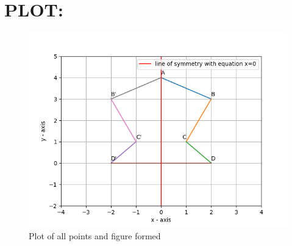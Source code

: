 \documentclass[11pt, letterpaper]{article}
\begin{document}
  \section{PLOT:}

 \begin{figure}[h]
 	\centering
 	\includegraphics[scale=0.7]{./Figs/Figure_1.png}
 	  \caption{Plot of all points and figure formed}
 \end{figure}
\end{document}
